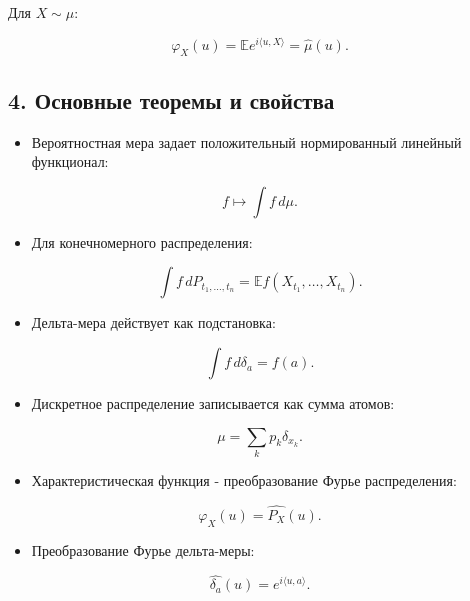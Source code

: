 \documentclass[
  11pt,
  a4paper,
]{article}
\providecommand{\tightlist}{%
  \setlength{\itemsep}{0pt}\setlength{\parskip}{0pt}}
\begin{document}
Для \(X\sim\mu\):

\[
\varphi_X(u)=\mathbb E e^{i\langle u,X\rangle}=\widehat\mu(u).
\]

\subsection{4. Основные теоремы и
свойства}\label{ux43eux441ux43dux43eux432ux43dux44bux435-ux442ux435ux43eux440ux435ux43cux44b-ux438-ux441ux432ux43eux439ux441ux442ux432ux430}

\begin{itemize}
\tightlist
\item
  Вероятностная мера задает положительный нормированный линейный
  функционал:
\end{itemize}

\[
f\mapsto \int f\,d\mu.
\]

\begin{itemize}
\tightlist
\item
  Для конечномерного распределения:
\end{itemize}

\[
\int f\,dP_{t_1,\ldots,t_n}
=
\mathbb E f(X_{t_1},\ldots,X_{t_n}).
\]

\begin{itemize}
\tightlist
\item
  Дельта-мера действует как подстановка:
\end{itemize}

\[
\int f\,d\delta_a=f(a).
\]

\begin{itemize}
\tightlist
\item
  Дискретное распределение записывается как сумма атомов:
\end{itemize}

\[
\mu=\sum_kp_k\delta_{x_k}.
\]

\begin{itemize}
\tightlist
\item
  Характеристическая функция - преобразование Фурье распределения:
\end{itemize}

\[
\varphi_X(u)=\widehat{P_X}(u).
\]

\begin{itemize}
\tightlist
\item
  Преобразование Фурье дельта-меры:
\end{itemize}

\[
\widehat{\delta_a}(u)=e^{i\langle u,a\rangle}.
\]
\end{document}
